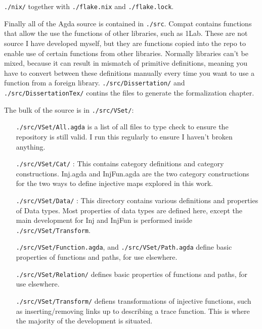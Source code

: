 \texttt{./nix/} together with \texttt{./flake.nix} and
\texttt{./flake.lock}.

Finally all of the Agda source is contained in \texttt{./src}. Compat
contains functions that allow the use the functions of other
libraries, such as 1Lab. These are not source I have developed myself,
but they are functions copied into the repo to enable use of certain
functions from other libraries. Normally libraries can't be mixed,
because it can result in mismatch of primitive definitions, meaning
you have to convert between these definitions manually every time you
want to use a function from a foreign
library. \texttt{./src/Dissertation/} and
\texttt{./src/DissertationTex/} contins the files to generate the
formalization chapter.

The bulk of the source is in \texttt{./src/VSet/}:

\begin{itemize}
  \item[\texttt{./src/VSet/All.agda}] is a list of all files to type
    check to ensure the repository is still valid. I run this
    regularly to ensure I haven't broken anything.
  \item[\texttt{./src/VSet/Cat/}]: This contains category definitions
    and category constructions. Inj.agda and InjFun.agda are the two
    category constructions for the two ways to define injective maps
    explored in this work.
  \item[\texttt{./src/VSet/Data/}]: This directory contains various
    definitions and properties of Data types. Most properties of data
    types are defined here, except the main development for Inj and
    InjFun is performed inside \texttt{./src/VSet/Transform}.
  \item[\texttt{./src/VSet/Function.agda}, and \texttt{./src/VSet/Path.agda}] define basic properties of functions and paths, for use elsewhere.
  \item[\texttt{./src/VSet/Relation/}] defines basic properties of functions and paths, for use elsewhere.
  \item[\texttt{./src/VSet/Transform/}] defiens transformations of
    injective functions, such as inserting/removing links up to
    describing a trace function. This is where the majority of the
    development is situated.
\end{itemize}
  
